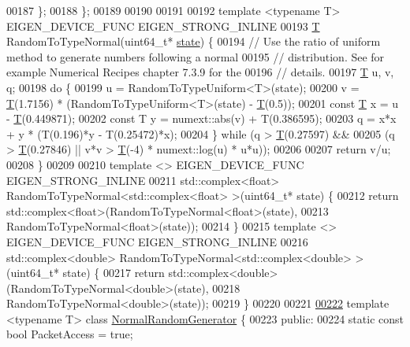 \begin{DoxyCode}
00187   \};
00188 \};
00189 
00190 
00191 
00192 \textcolor{keyword}{template} <\textcolor{keyword}{typename} T> EIGEN\_DEVICE\_FUNC EIGEN\_STRONG\_INLINE
00193 \hyperlink{group___sparse_core___module}{T} RandomToTypeNormal(uint64\_t* \hyperlink{structstate}{state}) \{
00194   \textcolor{comment}{// Use the ratio of uniform method to generate numbers following a normal}
00195   \textcolor{comment}{// distribution. See for example Numerical Recipes chapter 7.3.9 for the}
00196   \textcolor{comment}{// details.}
00197   \hyperlink{group___sparse_core___module}{T} u, v, q;
00198   \textcolor{keywordflow}{do} \{
00199     u = RandomToTypeUniform<T>(state);
00200     v = \hyperlink{group___sparse_core___module}{T}(1.7156) * (RandomToTypeUniform<T>(state) - \hyperlink{group___sparse_core___module}{T}(0.5));
00201     \textcolor{keyword}{const} \hyperlink{group___sparse_core___module}{T} x = u - \hyperlink{group___sparse_core___module}{T}(0.449871);
00202     \textcolor{keyword}{const} T y = numext::abs(v) + T(0.386595);
00203     q = x*x + y * (T(0.196)*y - T(0.25472)*x);
00204   \} \textcolor{keywordflow}{while} (q > \hyperlink{group___sparse_core___module}{T}(0.27597) &&
00205            (q > \hyperlink{group___sparse_core___module}{T}(0.27846) || v*v > \hyperlink{group___sparse_core___module}{T}(-4) * numext::log(u) * u*u));
00206 
00207   \textcolor{keywordflow}{return} v/u;
00208 \}
00209 
00210 \textcolor{keyword}{template} <> EIGEN\_DEVICE\_FUNC EIGEN\_STRONG\_INLINE
00211 std::complex<float> RandomToTypeNormal<std::complex<float> >(uint64\_t* state) \{
00212   \textcolor{keywordflow}{return} std::complex<float>(RandomToTypeNormal<float>(state),
00213                              RandomToTypeNormal<float>(state));
00214 \}
00215 \textcolor{keyword}{template} <> EIGEN\_DEVICE\_FUNC EIGEN\_STRONG\_INLINE
00216 std::complex<double> RandomToTypeNormal<std::complex<double> >(uint64\_t* state) \{
00217   \textcolor{keywordflow}{return} std::complex<double>(RandomToTypeNormal<double>(state),
00218                               RandomToTypeNormal<double>(state));
00219 \}
00220 
00221 
\hyperlink{class_eigen_1_1internal_1_1_normal_random_generator}{00222} \textcolor{keyword}{template} <\textcolor{keyword}{typename} T> \textcolor{keyword}{class }\hyperlink{class_eigen_1_1internal_1_1_normal_random_generator}{NormalRandomGenerator} \{
00223  \textcolor{keyword}{public}:
00224   \textcolor{keyword}{static} \textcolor{keyword}{const} \textcolor{keywordtype}{bool} PacketAccess = \textcolor{keyword}{true};

\end{DoxyCode}
